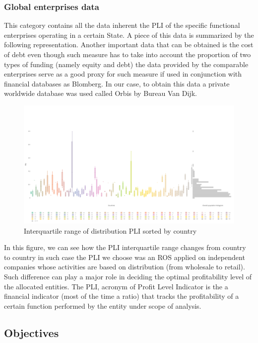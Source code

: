 \documentclass{article}
\begin{document}
\subsubsection{Global enterprises data}
This category contains all the data inherent the PLI of the specific functional enterprises operating in a certain State.
A piece of this data is summarized by the following representation. Another important data that can be obtained is the cost of debt \cite{berman_financial_2013} even though such measure has to take into account the proportion of two types of funding (namely equity and debt) the data provided by the comparable enterprises serve as a good proxy for such measure if used in conjunction with financial databases as Blomberg. In our case, to obtain this data a private worldwide database was used called Orbis by Bureau Van Dijk.

\begin{figure}[H]
\centering
\includegraphics[width=\textwidth]{Images/plidist.png}
\caption{Interquartile range of distribution PLI sorted by country}
\end{figure}

In this figure, we can see how the PLI interquartile range changes from country to country in such case the PLI we choose was an ROS applied on independent companies whose activities are based on distribution (from wholesale to retail). Such difference can play a major role in deciding the optimal profitability level of the allocated entities. The PLI, acronym of Profit Level Indicator is the a financial indicator (most of the time a ratio) that tracks the profitability of a certain function performed by the entity under scope of analysis.

\subsection{Objectives}
\end{document}

